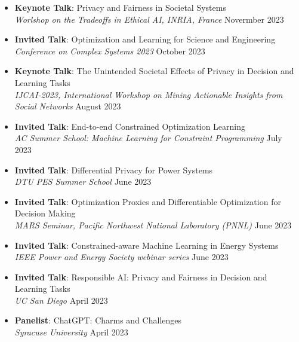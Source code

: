 

\begin{itemize}
  \item {\bf Keynote Talk}: {Privacy and Fairness in Societal Systems}\\
  {\em  Worlshop on the Tradeoffs in Ethical AI, INRIA, France}
  \hfill{Novermber 2023}

  \item {\bf Invited Talk}: {Optimization and Learning for Science and Engineering}\\
  {\em  Conference on Complex Systems 2023}
  \hfill{October 2023}

  \item {\bf Keynote Talk}: {The Unintended Societal Effects of Privacy in Decision and Learning Tasks}\\
  {\em  IJCAI-2023, International Workshop on Mining Actionable Insights from Social Networks}
  \hfill{August 2023}

  \item {\bf Invited Talk}: {End-to-end Constrained Optimization Learning}\\
  {\em  AC Summer School: Machine Learning for Constraint Programming}
  \hfill{July 2023}

  \item {\bf Invited Talk}: {Differential Privacy for Power Systems}\\
  {\em  DTU PES Summer School}
  \hfill{June 2023}

  \item {\bf Invited Talk}: {Optimization Proxies and Differentiable Optimization for Decision Making}\\
  {\em  MARS Seminar, Pacific Northwest National Laboratory (PNNL)}
  \hfill{June 2023}

  \item {\bf Invited Talk}: {Constrained-aware Machine Learning in Energy Systems}\\
  {\em  IEEE Power and Energy Society webinar series}
  \hfill{June 2023}

  \item {\bf Invited Talk}: {Responsible AI: Privacy and Fairness in Decision and Learning Tasks}\\
  {\em  UC San Diego}
  \hfill{April 2023}

  \item {\bf Panelist}: {ChatGPT: Charms and Challenges}\\
  {\em  Syracuse University}
  \hfill{April 2023}


\end{itemize}
